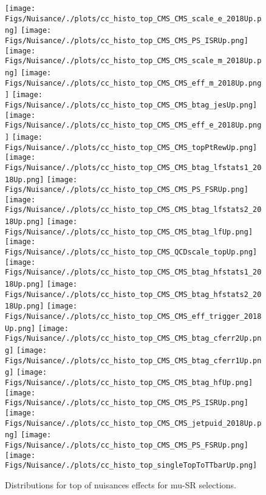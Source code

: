 \begin{figure*}[htbp]  
\centering 
\texttt{[image: Figs/Nuisance/./plots/cc\_histo\_top\_CMS\_CMS\_scale\_e\_2018Up.png]}
\texttt{[image: Figs/Nuisance/./plots/cc\_histo\_top\_CMS\_CMS\_PS\_ISRUp.png]}
\texttt{[image: Figs/Nuisance/./plots/cc\_histo\_top\_CMS\_CMS\_scale\_m\_2018Up.png]}
\texttt{[image: Figs/Nuisance/./plots/cc\_histo\_top\_CMS\_CMS\_eff\_m\_2018Up.png]}
\texttt{[image: Figs/Nuisance/./plots/cc\_histo\_top\_CMS\_CMS\_btag\_jesUp.png]}
\texttt{[image: Figs/Nuisance/./plots/cc\_histo\_top\_CMS\_CMS\_eff\_e\_2018Up.png]}
\texttt{[image: Figs/Nuisance/./plots/cc\_histo\_top\_CMS\_CMS\_topPtRewUp.png]}
\texttt{[image: Figs/Nuisance/./plots/cc\_histo\_top\_CMS\_CMS\_btag\_lfstats1\_2018Up.png]}
\texttt{[image: Figs/Nuisance/./plots/cc\_histo\_top\_CMS\_CMS\_PS\_FSRUp.png]}\\
\texttt{[image: Figs/Nuisance/./plots/cc\_histo\_top\_CMS\_CMS\_btag\_lfstats2\_2018Up.png]}
\texttt{[image: Figs/Nuisance/./plots/cc\_histo\_top\_CMS\_CMS\_btag\_lfUp.png]}
\texttt{[image: Figs/Nuisance/./plots/cc\_histo\_top\_CMS\_QCDscale\_topUp.png]}
\texttt{[image: Figs/Nuisance/./plots/cc\_histo\_top\_CMS\_CMS\_btag\_hfstats1\_2018Up.png]}
\texttt{[image: Figs/Nuisance/./plots/cc\_histo\_top\_CMS\_CMS\_btag\_hfstats2\_2018Up.png]}
\texttt{[image: Figs/Nuisance/./plots/cc\_histo\_top\_CMS\_CMS\_eff\_trigger\_2018Up.png]}
\texttt{[image: Figs/Nuisance/./plots/cc\_histo\_top\_CMS\_CMS\_btag\_cferr2Up.png]}
\texttt{[image: Figs/Nuisance/./plots/cc\_histo\_top\_CMS\_CMS\_btag\_cferr1Up.png]}
\texttt{[image: Figs/Nuisance/./plots/cc\_histo\_top\_CMS\_CMS\_btag\_hfUp.png]}\\
\texttt{[image: Figs/Nuisance/./plots/cc\_histo\_top\_CMS\_CMS\_PS\_ISRUp.png]}
\texttt{[image: Figs/Nuisance/./plots/cc\_histo\_top\_CMS\_CMS\_jetpuid\_2018Up.png]}
\texttt{[image: Figs/Nuisance/./plots/cc\_histo\_top\_CMS\_CMS\_PS\_FSRUp.png]}
\texttt{[image: Figs/Nuisance/./plots/cc\_histo\_top\_singleTopToTTbarUp.png]}
\\ 
\caption{ 
   Distributions for top of nuisances effects for mu-SR selections.
} 
\label{fig:top_mu_SR} 
\end{figure*} 




